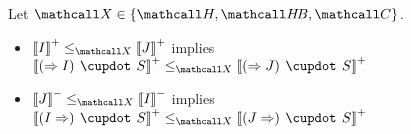 \begin{lemma}[Functoriality]
  Let $\ACVar \in \{\Heyting, \HeytingBrouwer, \Boolean\}$.
  ~\\\vspace{-1em}
  \begin{itemize}
    \item $\psint{I} \sementX \psint{J}$ implies $\psint{(\seq I) \mix S} \sementX
    \psint{(\seq J) \mix S}$
    \item $\nsint{J} \sementX \nsint{I}$ implies $\psint{(I \seq) \mix S}
    \sementX \psint{(J \seq) \mix S}$
  \end{itemize}
\end{lemma}

